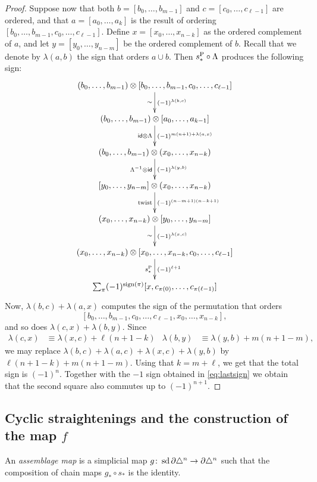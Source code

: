 \begin{proof}
	Suppose now that both $b=[b_0,\dots,b_{m-1}]$ and $c=[c_0,\dots,c_{\ell-1}]$ are ordered, and that $a = [a_0,\dots,a_k]$ is the result of ordering $[b_0,\dots,b_{m-1},c_0,\dots,c_{\ell-1}]$. Define $x=[x_0,\dots,x_{n-k}]$ as the ordered complement of $a$, and let $y=[y_0,\dots,y_{n-m}]$ be the ordered complement of $b$. Recall that we denote by $\lambda(a,b)$ the sign that orders $a\cup b$. Then $s_*^{\operatorname{P}}\circ \Lambda$ produces the following sign:
	\[
	\xymatrix{
		(b_0,\dots,b_{m-1}) \ot [b_0,\dots,b_{m-1},c_0,\dots,c_{\ell-1}]
		\ar[d]^-{(-1)^{\lambda(b,c)}}_-{\sim}
		\\
		(b_0,\dots,b_{m-1}) \ot [a_0,\dots,a_{k-1}]
		\ar[d]^{(-1)^{m(n+1)+\lambda(a,x)}}_{\id \ot \Lambda}
		\\
		(b_0,\dots,b_{m-1}) \ot (x_0,\dots,x_{n-k})
		\ar[d]^-{(-1)^{\lambda(y,b)}}_-{\Lambda^{-1} \ot \id}
		\\
		[y_0,\dots,y_{n-m}] \ot (x_0,\dots,x_{n-k})
		\ar[d]^-{(-1)^{(n-m+1)(n-k+1)}}_-{\twist}
		\\
		(x_0,\dots,x_{n-k}) \ot [y_0,\dots,y_{n-m}]
		\ar[d]^-{(-1)^{\lambda(x,c)}}_-{\sim}
		\\
		(x_0,\dots,x_{n-k}) \ot [x_0,\dots,x_{n-k},c_0,\dots,c_{\ell-1}]
		\ar[d]^-{(-1)^{\ell+1}}_-{s_*^{\Psd}}
		\\
		\sum_{\perm} (-1)^{\sign{\perm}}[x,c_{\perm(0)},\dots,c_{\perm(\ell-1)}]
	}
	\]
	Now, $\lambda(b,c) + \lambda(a,x)$ computes the sign of the permutation that orders
	\[
	[b_0,\dots,b_{m-1},c_0,\dots,c_{\ell-1},x_{0},\dots,x_{n-k}],
	\]
	and so does $\lambda(c,x)+\lambda(b,y)$. Since
	\begin{align*}
		\lambda(c,x) &\equiv \lambda(x,c) + \ell(n+1-k)
		&
		\lambda(b,y) &\equiv \lambda(y,b) + m(n+1-m),
	\end{align*}
	we may replace $\lambda(b,c)+\lambda(a,c) + \lambda(x,c) + \lambda(y,b)$ by $\ell(n+1-k)+m(n+1-m)$. Using that $k=m+\ell$, we get that the total sign is $(-1)^{n}$. Together with the $-1$ sign obtained in \eqref{eq:lastsign} we obtain that the second square also commutes up to $(-1)^{n+1}$.
\end{proof}

\subsection{Cyclic straightenings and the construction of the map \texorpdfstring{$f$}{f}}

\begin{definition}
	An \emph{assemblage map} is a simplicial map $g \colon \operatorname{sd} \partial \triangle^n \to \partial \triangle^n$ such that the composition of chain maps $g_*\circ s_*$ is the identity.
\end{definition}

